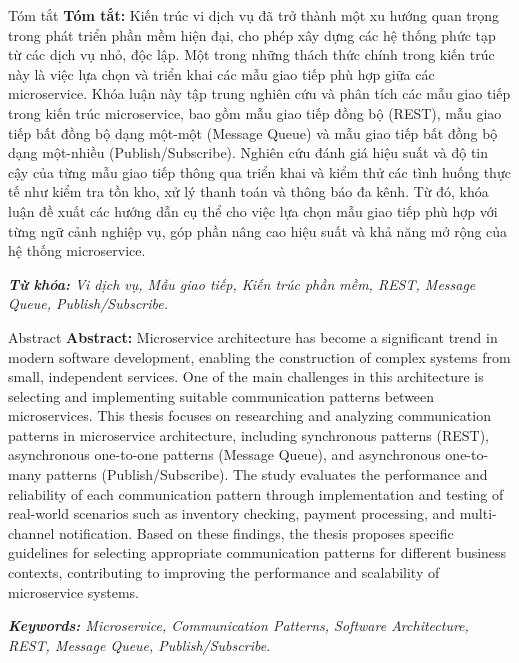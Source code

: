 \documentclass{uetgraduation}
\begin{document}
\begin{preamble}{Tóm tắt}
    \textbf{Tóm tắt:} Kiến trúc vi dịch vụ đã trở thành  một xu hướng quan trọng trong phát triển phần mềm hiện đại, cho phép xây dựng các hệ thống phức tạp từ các dịch vụ nhỏ, độc lập. Một trong những thách thức chính trong kiến trúc này là việc lựa chọn và triển khai các mẫu giao tiếp phù hợp giữa các microservice. Khóa luận này tập trung nghiên cứu và phân tích các mẫu giao tiếp trong kiến trúc microservice, bao gồm mẫu giao tiếp đồng bộ (REST), mẫu giao tiếp bất đồng bộ dạng một-một (Message Queue) và mẫu giao tiếp bất đồng bộ dạng một-nhiều (Publish/Subscribe). Nghiên cứu đánh giá hiệu suất và độ tin cậy của từng mẫu giao tiếp thông qua triển khai và kiểm thử các tình huống thực tế như kiểm tra tồn kho, xử lý thanh toán và thông báo đa kênh. Từ đó, khóa luận đề xuất các hướng dẫn cụ thể cho việc lựa chọn mẫu giao tiếp phù hợp với từng ngữ cảnh nghiệp vụ, góp phần nâng cao hiệu suất và khả năng mở rộng của hệ thống microservice.

    \textit{\textbf{Từ khóa:} Vi dịch vụ, Mẫu giao tiếp, Kiến trúc phần mềm, REST, Message Queue, Publish/Subscribe.}
\end{preamble}

\begin{preamble}{Abstract}
    \textbf{Abstract:} Microservice architecture has become a significant trend in modern software development, enabling the construction of complex systems from small, independent services. One of the main challenges in this architecture is selecting and implementing suitable communication patterns between microservices. This thesis focuses on researching and analyzing communication patterns in microservice architecture, including synchronous patterns (REST), asynchronous one-to-one patterns (Message Queue), and asynchronous one-to-many patterns (Publish/Subscribe). The study evaluates the performance and reliability of each communication pattern through implementation and testing of real-world scenarios such as inventory checking, payment processing, and multi-channel notification. Based on these findings, the thesis proposes specific guidelines for selecting appropriate communication patterns for different business contexts, contributing to improving the performance and scalability of microservice systems.

    \textit{\textbf{Keywords:} Microservice, Communication Patterns, Software Architecture, REST, Message Queue, Publish/Subscribe.}
\end{preamble}
\end{document}
